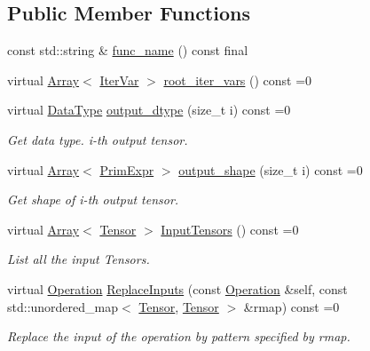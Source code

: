 \subsection*{Public Member Functions}
\begin{DoxyCompactItemize}
\item 
const std\+::string \& \hyperlink{classtvm_1_1te_1_1OperationNode_a03b4cec709aed13088b1127a5f90c382}{func\+\_\+name} () const final
\item 
virtual \hyperlink{classtvm_1_1Array}{Array}$<$ \hyperlink{classtvm_1_1tir_1_1IterVar}{Iter\+Var} $>$ \hyperlink{classtvm_1_1te_1_1OperationNode_a8d15cfe7d0d721da305c1b36e9f5a914}{root\+\_\+iter\+\_\+vars} () const =0
\item 
virtual \hyperlink{namespacetvm_a41918af1a1dc386388639a9d3ad06c5d}{Data\+Type} \hyperlink{classtvm_1_1te_1_1OperationNode_a6bcb7f0c177c642d82a5a200d13369f0}{output\+\_\+dtype} (size\+\_\+t i) const =0
\begin{DoxyCompactList}\small\item\em Get data type. i-\/th output tensor. \end{DoxyCompactList}\item 
virtual \hyperlink{classtvm_1_1Array}{Array}$<$ \hyperlink{classtvm_1_1PrimExpr}{Prim\+Expr} $>$ \hyperlink{classtvm_1_1te_1_1OperationNode_a7c4fc476de1543ea65c83e02631bfd09}{output\+\_\+shape} (size\+\_\+t i) const =0
\begin{DoxyCompactList}\small\item\em Get shape of i-\/th output tensor. \end{DoxyCompactList}\item 
virtual \hyperlink{classtvm_1_1Array}{Array}$<$ \hyperlink{classtvm_1_1te_1_1Tensor}{Tensor} $>$ \hyperlink{classtvm_1_1te_1_1OperationNode_a9675fbb905d62de5b86624388acec4b1}{Input\+Tensors} () const =0
\begin{DoxyCompactList}\small\item\em List all the input Tensors. \end{DoxyCompactList}\item 
virtual \hyperlink{classtvm_1_1te_1_1Operation}{Operation} \hyperlink{classtvm_1_1te_1_1OperationNode_a9a876a433cfbe32215c3802ef520016e}{Replace\+Inputs} (const \hyperlink{classtvm_1_1te_1_1Operation}{Operation} \&self, const std\+::unordered\+\_\+map$<$ \hyperlink{classtvm_1_1te_1_1Tensor}{Tensor}, \hyperlink{classtvm_1_1te_1_1Tensor}{Tensor} $>$ \&rmap) const =0
\begin{DoxyCompactList}\small\item\em Replace the input of the operation by pattern specified by rmap. \end{DoxyCompactList}\item 

\end{DoxyCompactItemize}
